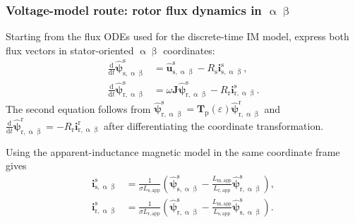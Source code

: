\begin{frame}
    \frametitle{Voltage-model route: rotor flux dynamics in $\upalpha\upbeta$}
    Starting from the flux ODEs used for the discrete-time IM model, express both flux vectors in stator-oriented $\upalpha\upbeta$ coordinates:
    \begin{equation}
        \begin{aligned}
            \frac{\mathrm{d}}{\mathrm{d}t}\hat{\bm{\psi}}^{\mathrm{s}}_{\mathrm{s},\upalpha\upbeta}
             & =\hat{\bm{u}}^{\mathrm{s}}_{\mathrm{s},\upalpha\upbeta}
            -R_\mathrm{s}\bm{i}^{\mathrm{s}}_{\mathrm{s},\upalpha\upbeta},            \\
            \frac{\mathrm{d}}{\mathrm{d}t}\hat{\bm{\psi}}^{\mathrm{s}}_{\mathrm{r},\upalpha\upbeta}
             & =\omega\bm{J}\hat{\bm{\psi}}^{\mathrm{s}}_{\mathrm{r},\upalpha\upbeta}
            -R_\mathrm{r}\bm{i}^{\mathrm{s}}_{\mathrm{r},\upalpha\upbeta}.
        \end{aligned}
        \label{eq:IM_DTC_flux_odes_stator_frame_v6}
    \end{equation}\pause%
    The second equation follows from $\hat{\bm{\psi}}^{\mathrm{s}}_{\mathrm{r},\upalpha\upbeta}=\bm{T}_\mathrm{p}(\varepsilon)\hat{\bm{\psi}}^{\mathrm{r}}_{\mathrm{r},\upalpha\upbeta}$ and $\frac{\mathrm{d}}{\mathrm{d}t}\hat{\bm{\psi}}^{\mathrm{r}}_{\mathrm{r},\upalpha\upbeta}=-R_\mathrm{r}\bm{i}^{\mathrm{r}}_{\mathrm{r},\upalpha\upbeta}$ after differentiating the coordinate transformation.\pause\par\medskip
    Using the apparent-inductance magnetic model in the same coordinate frame gives
    \begin{equation}
        \begin{aligned}
            \bm{i}^{\mathrm{s}}_{\mathrm{s},\upalpha\upbeta}
             & =\frac{1}{\sigma L_{\mathrm{s,app}}}
            \left(\hat{\bm{\psi}}^{\mathrm{s}}_{\mathrm{s},\upalpha\upbeta}
            -\frac{L_{\mathrm{m,app}}}{L_{\mathrm{r,app}}}
            \hat{\bm{\psi}}^{\mathrm{s}}_{\mathrm{r},\upalpha\upbeta}\right), \\
            \bm{i}^{\mathrm{s}}_{\mathrm{r},\upalpha\upbeta}
             & =\frac{1}{\sigma L_{\mathrm{r,app}}}
            \left(\hat{\bm{\psi}}^{\mathrm{s}}_{\mathrm{r},\upalpha\upbeta}
            -\frac{L_{\mathrm{m,app}}}{L_{\mathrm{s,app}}}
            \hat{\bm{\psi}}^{\mathrm{s}}_{\mathrm{s},\upalpha\upbeta}\right).
        \end{aligned}
        \label{eq:IM_DTC_apparent_current_elimination_v6}
    \end{equation}
\end{frame}

